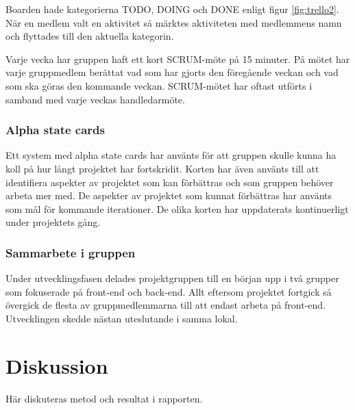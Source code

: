 \documentclass{article}
\begin{document}
Boarden hade kategorierna TODO, DOING och DONE enligt figur \ref{fig:trello2}. När en medlem valt en aktivitet så märktes aktiviteten med medlemmens namn och flyttades till den aktuella kategorin. 

Varje vecka har gruppen haft ett kort SCRUM-möte på 15 minuter. På mötet har varje gruppmedlem berättat vad som har gjorts den föregående veckan och vad som ska göras den kommande veckan. SCRUM-mötet har oftast utförts i samband med varje veckas handledarmöte.

\subsubsection{Alpha state cards}
Ett system med alpha state cards har använts för att gruppen skulle kunna ha koll på hur långt projektet har fortskridit. Korten har även använts till att identifiera aspekter av projektet som kan förbättras och som gruppen behöver arbeta mer med. De aspekter av projektet som kunnat förbättras har använts som mål för kommande iterationer. De olika korten har uppdaterats kontinuerligt under projektets gång.

\subsubsection{Sammarbete i gruppen}
Under utvecklingsfasen delades projektgruppen till en början upp i två grupper som fokuserade på front-end och back-end. Allt eftersom projektet fortgick så övergick de flesta av gruppmedlemmarna till att endast arbeta på front-end. Utvecklingen skedde nästan uteslutande i samma lokal.


\clearpage

\clearpage

\section{Diskussion}
Här diskuteras metod och resultat i rapporten.
\end{document}
